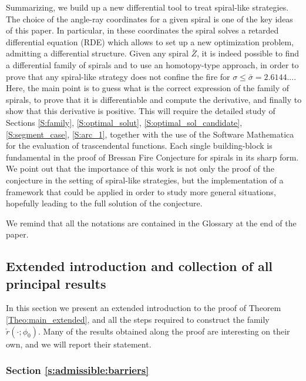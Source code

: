\documentclass[reqno]{amsart}
\theoremstyle{definition} \newtheorem{definition}{Definition}[section]
\theoremstyle{definition} \newtheorem{remark}[definition]{Remark}
\theoremstyle{plain} \newtheorem{lemma}[definition]{Lemma}
\theoremstyle{plain} \newtheorem{proposition}[definition]{Proposition}
\theoremstyle{plain} \newtheorem{theorem}[definition]{Theorem}
\theoremstyle{plain} \newtheorem{corollary}[definition]{Corollary}
\theoremstyle{definition} \newtheorem{example}[definition]{Example}
\theoremstyle{plain} \newtheorem{claim}[clai]{Claim}
\theoremstyle{definition} \newtheorem{assumption}[definition]{Assumption}
\theoremstyle{definition} \newtheorem{observation}[definition]{Observation}
\newcommand{\1}{\mathbbm 1}
\numberwithin{equation}{section} %
\theoremstyle{plain} \newtheorem*{theorem*}{Theorem}
\theoremstyle{plain} \newtheorem{mthm}[maintheorem]{Main Theorem}
\theoremstyle{plain} \newtheorem*{mthm*}{Main Theorem}
\theoremstyle{plain} \newtheorem*{conjecture*}{Conjecture}
\theoremstyle{plain} \newtheorem{conjecture}[definition]{Conjecture}
\theoremstyle{plain} \newtheorem*{problem*}{Problem}
\begin{document}
Summarizing, we build up a new differential tool to treat spiral-like strategies. The choice of the angle-ray coordinates for a given spiral is one of the key ideas of this paper. In particular, in these coordinates the spiral solves a retarded differential equation (RDE) which allows to set up a new optimization problem, admitting a differential structure. Given any spiral $\bar Z$, it is indeed possible to find a differential family of spirals and to use an homotopy-type approach, in order to prove that any spiral-like strategy does not confine the fire for $\sigma\leq\bar\sigma=2.6144...$. Here, the main point is to guess what is the correct expression of the family of spirals, to prove that it is differentiable and compute the derivative, and finally to show that this derivative is positive. This will require the detailed study of Sections \ref{S:family}, \ref{S:optimal_solut}, \ref{S:optimal_sol_candidate}, \ref{S:segment_case}, \ref{S:arc_1}, together with the use of the Software Mathematica for the evaluation of trascendental functions. Each single building-block is fundamental in the proof of Bressan Fire Conjecture for spirals in its sharp form. We point out that the importance of this work is not only the proof of the conjecture in the setting of spiral-like strategies, but the implementation of a framework that could be applied in order to study more general situations, hopefully leading to the full solution of the conjecture. %

\medskip

We remind that all the notations are contained in the Glossary at the end of the paper.


\subsection{Extended introduction and collection of all principal results}
\label{Ss:extend_more_intro}


In this section we present an extended introduction to the proof of Theorem \ref{Theo:main_extended}, and all the steps required to construct the family $\check r(\cdot;\phi_0)$. Many of the results obtained along the proof are interesting on their own, and we will report their statement.


\subsubsection{Section \ref{s:admissible:barriers}}
\label{Sss:admiss_barr_intro}
\end{document}
